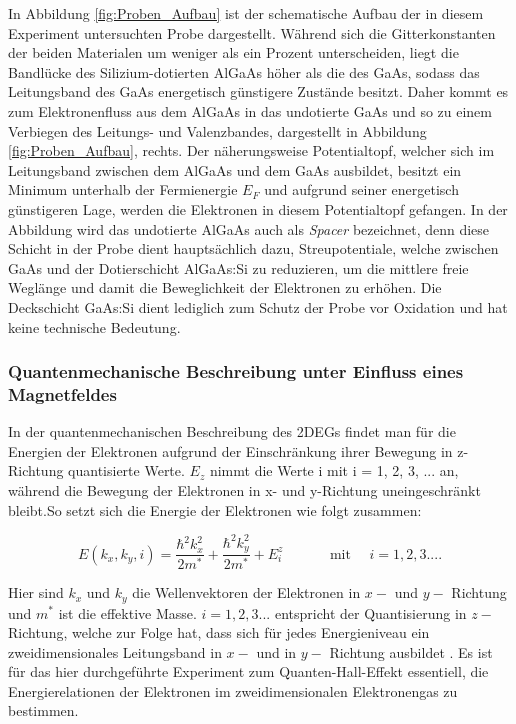 In Abbildung \ref{fig:Proben_Aufbau} ist der schematische Aufbau der in diesem Experiment untersuchten Probe dargestellt. 
Während sich die Gitterkonstanten der beiden Materialen um weniger als ein Prozent unterscheiden, liegt die Bandlücke des  Silizium-dotierten AlGaAs  höher als die des GaAs, sodass das Leitungsband des GaAs energetisch günstigere Zustände besitzt. Daher kommt es zum Elektronenfluss aus dem AlGaAs in das undotierte GaAs und so zu einem Verbiegen des Leitungs- und Valenzbandes, dargestellt in Abbildung \ref{fig:Proben_Aufbau}, rechts.
Der näherungsweise Potentialtopf, welcher sich im Leitungsband zwischen dem AlGaAs und dem GaAs ausbildet, besitzt ein Minimum unterhalb der Fermienergie $E_F$ und aufgrund seiner energetisch günstigeren Lage, werden die Elektronen in diesem Potentialtopf gefangen. 
In der Abbildung wird das undotierte AlGaAs auch als \textit{Spacer} bezeichnet, denn diese Schicht in der Probe dient hauptsächlich dazu, Streupotentiale, welche zwischen GaAs und der Dotierschicht AlGaAs:Si zu reduzieren, um die mittlere freie Weglänge und damit die Beweglichkeit der Elektronen zu erhöhen. Die Deckschicht GaAs:Si dient lediglich zum Schutz der Probe vor Oxidation und hat keine technische Bedeutung. 

\subsubsection{Quantenmechanische Beschreibung unter Einfluss eines Magnetfeldes}
In der quantenmechanischen Beschreibung des 2DEGs findet man für die Energien der Elektronen aufgrund der Einschränkung ihrer Bewegung in z-Richtung quantisierte Werte. $E_z$ nimmt die Werte i mit i = 1, 2, 3, ... an, während die Bewegung der Elektronen in x- und y-Richtung uneingeschränkt bleibt.So setzt sich die Energie der Elektronen wie folgt zusammen:

\begin{equation}
E(k_x,k_y,i)=\frac{\hbar^2k_x^2}{2m^*}+\frac{\hbar^2k_y^2}{2m^*}+E_i^z   \text{~~~~~~~~~ mit ~~~} i=1,2,3....
\label{eq:energie_2DEG}
\end{equation}

Hier sind $k_x$ und $k_y$ die Wellenvektoren der Elektronen in $x -$ und $y-$ Richtung und $m^*$ ist die effektive Masse. $i = 1,2,3...$  entspricht der Quantisierung in $z-$ Richtung, welche zur Folge hat, dass sich für jedes Energieniveau ein zweidimensionales  Leitungsband in $x-$ und in $y-$ Richtung ausbildet \cite[Kap. 3.6]{kopitzki_einfuhrung_2009}. 
Es ist für das hier durchgeführte Experiment zum Quanten-Hall-Effekt essentiell, die Energierelationen der Elektronen im zweidimensionalen Elektronengas zu bestimmen. 

